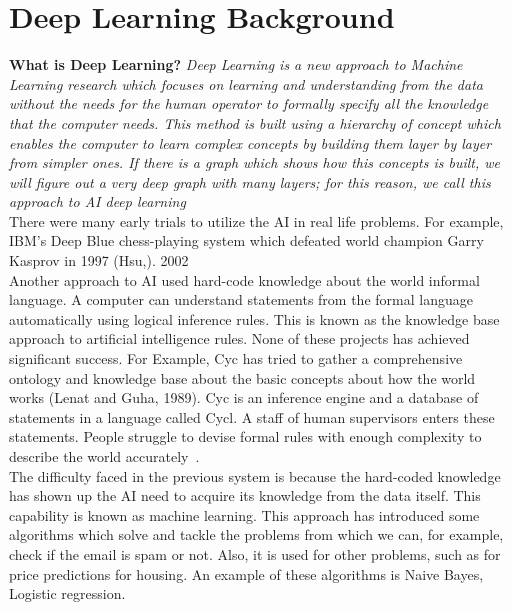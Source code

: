 \clearpage
\section{Deep Learning Background}\label{Sec:Deep_Learning_Background}


  \textbf{What is Deep Learning?} \textit{ Deep Learning is a new approach to Machine Learning research which focuses on learning and understanding from the data without the needs for the human operator to formally specify all the knowledge that the computer needs. This method is built using a hierarchy of concept which enables the computer to learn complex concepts by building them layer by layer from simpler ones. If there is a graph which shows how this concepts is built, we will figure out a very deep graph with many layers; for this reason, we call this approach to AI deep learning~\cite{Goodfellow-et-al-2016}}\\

  There were many early trials to utilize the AI in real life problems. For example, IBM's Deep Blue chess-playing system which defeated world champion Garry Kasprov in 1997 (Hsu,). 2002 %
  \\

  Another approach to AI used hard-code knowledge about the world informal language. A computer can understand statements from the formal language automatically using logical inference rules. This is known as the knowledge base approach to artificial intelligence rules. None of these projects has achieved significant success. For Example, Cyc has tried to gather a comprehensive ontology and knowledge base about the basic concepts about how the world works (Lenat and Guha, 1989). Cyc is an inference engine and a database of statements in a language called Cycl. A staff of human supervisors enters these statements. People struggle to devise formal rules with enough complexity to describe the world accurately~\cite{Goodfellow-et-al-2016}.\\

      The difficulty faced in the previous system is because the hard-coded knowledge has shown up the AI need to acquire its knowledge from the data itself. This capability is known as machine learning. This approach has introduced some algorithms which solve and tackle the problems from which we can, for example, check if the email is spam or not. Also, it is used for other problems, such as for price predictions for housing. An example of these algorithms is Naive Bayes, Logistic regression.

